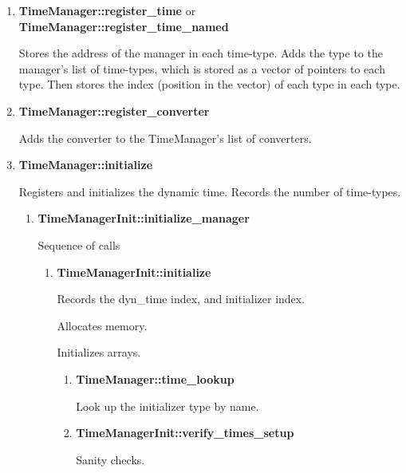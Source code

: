 {\begin{enumerate}  %
\item \textbf{TimeManager::register\_time} or \textbf{TimeManager::register\_time\_named}\par
Stores the address of the manager in each time-type.  Adds the
type to the manager's list of time-types, which is
stored as a vector of pointers to each type.  Then stores the index
(position in the vector) of each type in each type. 

\item \textbf{TimeManager::register\_converter} \par
Adds the converter to the TimeManager's list of
converters.

\clearpage

\item \textbf{TimeManager::initialize}\par
Registers and initializes the dynamic time. Records the number
of time-types.
{\begin{enumerate}   %

\item \textbf{TimeManagerInit::initialize\_manager}\par
Sequence of calls

{\begin{enumerate}  %
\item \textbf{TimeManagerInit::initialize}\par
Records the dyn\_time index, and initializer index.

Allocates memory.

Initializes arrays.

{\begin{enumerate}  %
\item \textbf{TimeManager::time\_lookup}\par
Look up the initializer type by name.
\item \textbf{TimeManagerInit::verify\_times\_setup} \par
Sanity checks.
\end{enumerate}}  %


\end{enumerate}}
\end{enumerate}}
\end{enumerate}}
